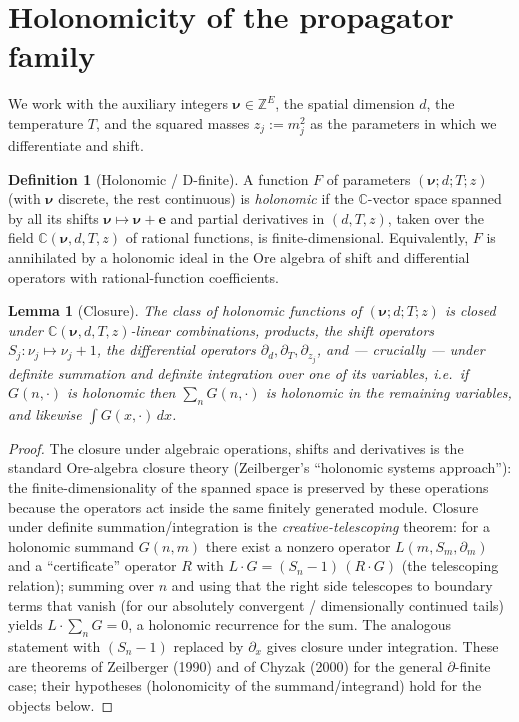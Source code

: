 \documentclass{amsart}
\newtheorem{lemma}{Lemma}
\theoremstyle{definition}
\newtheorem{definition}{Definition}
\begin{document}
\section{Holonomicity of the propagator family}

We work with the auxiliary integers $\boldsymbol\nu\in\mathbb Z^E$, the
spatial dimension $d$, the temperature $T$, and the squared masses
$z_j:=m_j^2$ as the parameters in which we differentiate and shift.

\begin{definition}[Holonomic / D-finite]
A function $F$ of parameters $(\boldsymbol\nu;d;T;z)$ (with $\boldsymbol\nu$
discrete, the rest continuous) is \emph{holonomic} if the $\mathbb C$-vector
space spanned by all its shifts $\boldsymbol\nu\mapsto\boldsymbol\nu+\mathbf e$
and partial derivatives in $(d,T,z)$, taken over the field
$\mathbb C(\boldsymbol\nu,d,T,z)$ of rational functions, is
finite-dimensional. Equivalently, $F$ is annihilated by a holonomic ideal in
the Ore algebra of shift and differential operators with rational-function
coefficients.
\end{definition}

\begin{lemma}[Closure]\label{lem:closure}
The class of holonomic functions of $(\boldsymbol\nu;d;T;z)$ is closed under
$\mathbb C(\boldsymbol\nu,d,T,z)$-linear combinations, products, the shift
operators $S_j:\nu_j\mapsto\nu_j+1$, the differential operators
$\partial_d,\partial_T,\partial_{z_j}$, and --- crucially --- under
\emph{definite summation and definite integration} over one of its variables,
i.e.\ if $G(n,\cdot)$ is holonomic then $\sum_n G(n,\cdot)$ is holonomic in the
remaining variables, and likewise $\int G(x,\cdot)\,dx$.
\end{lemma}

\begin{proof}
The closure under algebraic operations, shifts and derivatives is the standard
Ore-algebra closure theory (Zeilberger's ``holonomic systems approach''): the
finite-dimensionality of the spanned space is preserved by these operations
because the operators act inside the same finitely generated module.
Closure under definite summation/integration is the
\emph{creative-telescoping} theorem: for a holonomic summand $G(n,m)$ there
exist a nonzero operator $L(m,S_m,\partial_m)$ and a ``certificate'' operator
$R$ with $L\cdot G = (S_n-1)\,(R\cdot G)$ (the telescoping relation); summing
over $n$ and using that the right side telescopes to boundary terms that
vanish (for our absolutely convergent / dimensionally continued tails) yields
$L\cdot\sum_n G=0$, a holonomic recurrence for the sum. The analogous
statement with $(S_n-1)$ replaced by $\partial_x$ gives closure under
integration. These are theorems of Zeilberger (1990) and of Chyzak (2000) for
the general $\partial$-finite case; their hypotheses (holonomicity of the
summand/integrand) hold for the objects below.
\end{proof}
\end{document}
